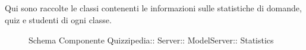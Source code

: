\subsection{}
Qui sono raccolte le classi contenenti le informazioni sulle statistiche di domande, quiz e studenti di ogni classe.
\begin{figure}[H]
\centering
\noindent{}
\caption[Schema Componente Statistics]{Schema Componente Quizzipedia:: Server:: ModelServer:: Statistics}
\end{figure}
